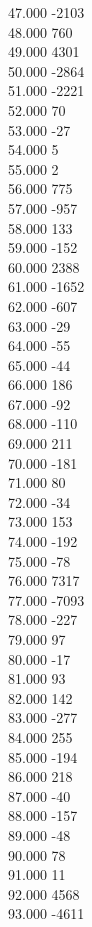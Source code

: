 { 47.000	-2103 \\
 48.000	760 \\
 49.000	4301 \\
 50.000	-2864 \\
 51.000	-2221 \\
 52.000	70 \\
 53.000	-27 \\
 54.000	5 \\
 55.000	2 \\
 56.000	775 \\
 57.000	-957 \\
 58.000	133 \\
 59.000	-152 \\
 60.000	2388 \\
 61.000	-1652 \\
 62.000	-607 \\
 63.000	-29 \\
 64.000	-55 \\
 65.000	-44 \\
 66.000	186 \\
 67.000	-92 \\
 68.000	-110 \\
 69.000	211 \\
 70.000	-181 \\
 71.000	80 \\
 72.000	-34 \\
 73.000	153 \\
 74.000	-192 \\
 75.000	-78 \\
 76.000	7317 \\
 77.000	-7093 \\
 78.000	-227 \\
 79.000	97 \\
 80.000	-17 \\
 81.000	93 \\
 82.000	142 \\
 83.000	-277 \\
 84.000	255 \\
 85.000	-194 \\
 86.000	218 \\
 87.000	-40 \\
 88.000	-157 \\
 89.000	-48 \\
 90.000	78 \\
 91.000	11 \\
 92.000	4568 \\
 93.000	-4611 \\
}
